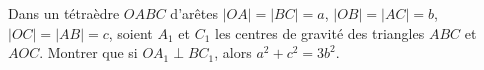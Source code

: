 Dans un tétraèdre $OABC$ d'arêtes $|OA| = |BC| = a$, $|OB| = |AC| = b$, $|OC| = |AB| = c$, soient $A_1$ et $C_1$ les centres de gravité des triangles $ABC$ et $AOC$. Montrer que si $OA_1 \perp BC_1$, alors $a^2 + c^2 = 3b^2$.
